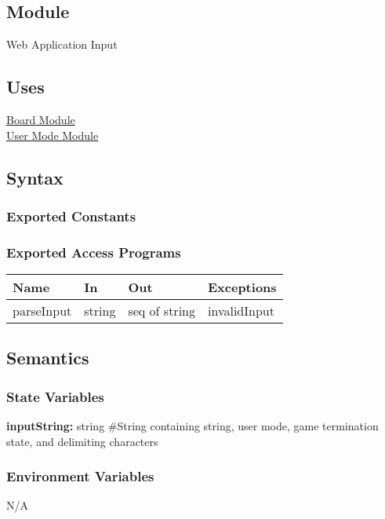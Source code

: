 \documentclass[12pt, titlepage]{article}
\begin{document}
    \subsection{Module}
    Web Application Input

    \subsection{Uses}
    \hyperref[mBoard]{Board Module}\\
    \hyperref[mMode]{User Mode Module}

    \subsection{Syntax}
    \subsubsection{Exported Constants}

    \subsubsection{Exported Access Programs}
        \begin{center}
        \begin{tabular}{p{4.5cm} p{3cm} p{4cm} p{2.5cm}}
        \hline
        \textbf{Name} & \textbf{In} & \textbf{Out} & \textbf{Exceptions} \\
        \hline
        parseInput & string & seq of string & invalidInput \\
        \hline
        \end{tabular}
        \end{center}

    \subsection{Semantics}
    \subsubsection{State Variables}
    \textbf{inputString:} string \#String containing \cite{FEN} string, user mode, game 
    termination state, and delimiting characters

    \subsubsection{Environment Variables}
    N/A
\end{document}
